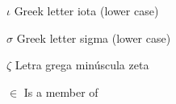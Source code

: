 \documentclass[
	12pt,				%
	openright,			%
	oneside,			%
	a4paper,			%
	sumario=tradicional,%
	french,				%
	spanish,			%
	brazil,				%
    english
	]{abntex2}
\begin{document}
\begin{simbolos}
  \item[$ \iota $] Greek letter iota (lower case)
  \item[$ \sigma $] Greek letter sigma (lower case)
  \item[$ \zeta $] Letra grega minúscula zeta
  \item[$ \in $] Is a member of
\end{simbolos}

\tableofcontents*
\cleardoublepage

\textual

\setcounter{secnumdepth}{3}









%

\postextual



%
%

\end{document}
